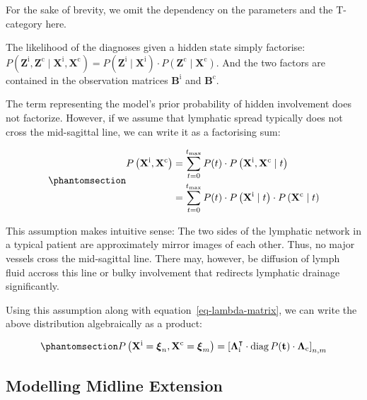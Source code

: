\documentclass[
  sn-mathphys-num,
]{sn-jnl}
\begin{document}
For the sake of brevity, we omit the dependency on the parameters and
the T-category here.

The likelihood of the diagnoses given a hidden state simply factorise:
\(P \left( \mathbf{Z}^\text{i}, \mathbf{Z}^\text{c} \mid \mathbf{X}^\text{i}, \mathbf{X}^\text{c} \right) = P \left( \mathbf{Z}^\text{i} \mid \mathbf{X}^\text{i} \right) \cdot P \left( \mathbf{Z}^\text{c} \mid \mathbf{X}^\text{c} \right)\).
And the two factors are contained in the observation matrices
\(\mathbf{B}^\text{i}\) and \(\mathbf{B}^\text{c}\).

The term representing the model's prior probability of hidden
involvement does not factorize. However, if we assume that lymphatic
spread typically does not cross the mid-sagittal line, we can write it
as a factorising sum:

\begin{equation}\phantomsection\label{eq-bilateral-marginal}{
\begin{aligned}
P \left( \mathbf{X}^\text{i}, \mathbf{X}^\text{c} \right) &= \sum_{t=0}^{t_\text{max}} P(t) \cdot P \left( \mathbf{X}^\text{i}, \mathbf{X}^\text{c} \mid t \right) \\
&= \sum_{t=0}^{t_\text{max}} P(t) \cdot P \left( \mathbf{X}^\text{i} \mid t \right) \cdot P \left( \mathbf{X}^\text{c} \mid t \right)
\end{aligned}
}\end{equation}

This assumption makes intuitive sense: The two sides of the lymphatic
network in a typical patient are approximately mirror images of each
other. Thus, no major vessels cross the mid-sagittal line. There may,
however, be diffusion of lymph fluid accross this line or bulky
involvement that redirects lymphatic drainage significantly.

Using this assumption along with equation~\ref{eq-lambda-matrix}, we can
write the above distribution algebraically as a product:

\begin{equation}\phantomsection\label{eq-bilateral-marginal-algebra}{
P \left( \mathbf{X}^\text{i} = \boldsymbol{\xi}_n, \mathbf{X}^\text{c} = \boldsymbol{\xi}_m \right) = \left[ \boldsymbol{\Lambda}^\intercal_\text{i} \cdot \operatorname{diag} P(\mathbf{t}) \cdot \boldsymbol{\Lambda}_\text{c} \right]_{n,m}
}\end{equation}

\subsection{Modelling Midline Extension}\label{sec-midline}
\end{document}
